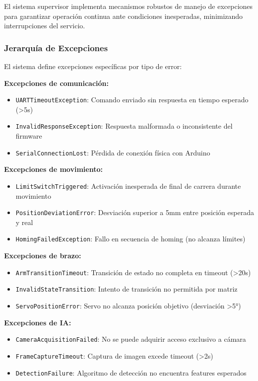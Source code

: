 El sistema supervisor implementa mecanismos robustos de manejo de excepciones para garantizar operación continua ante condiciones inesperadas, minimizando interrupciones del servicio.

\subsubsection{Jerarquía de Excepciones}

El sistema define excepciones específicas por tipo de error:

\textbf{Excepciones de comunicación:}
\begin{itemize}
    \item \texttt{UARTTimeoutException}: Comando enviado sin respuesta en tiempo esperado (>5s)
    \item \texttt{InvalidResponseException}: Respuesta malformada o inconsistente del firmware
    \item \texttt{SerialConnectionLost}: Pérdida de conexión física con Arduino
\end{itemize}

\textbf{Excepciones de movimiento:}
\begin{itemize}
    \item \texttt{LimitSwitchTriggered}: Activación inesperada de final de carrera durante movimiento
    \item \texttt{PositionDeviationError}: Desviación superior a 5mm entre posición esperada y real
    \item \texttt{HomingFailedException}: Fallo en secuencia de homing (no alcanza límites)
\end{itemize}

\textbf{Excepciones de brazo:}
\begin{itemize}
    \item \texttt{ArmTransitionTimeout}: Transición de estado no completa en timeout (>20s)
    \item \texttt{InvalidStateTransition}: Intento de transición no permitida por matriz
    \item \texttt{ServoPositionError}: Servo no alcanza posición objetivo (desviación >5°)
\end{itemize}

\textbf{Excepciones de IA:}
\begin{itemize}
    \item \texttt{CameraAcquisitionFailed}: No se puede adquirir acceso exclusivo a cámara
    \item \texttt{FrameCaptureTimeout}: Captura de imagen excede timeout (>2s)
    \item \texttt{DetectionFailure}: Algoritmo de detección no encuentra features esperados
\end{itemize}


